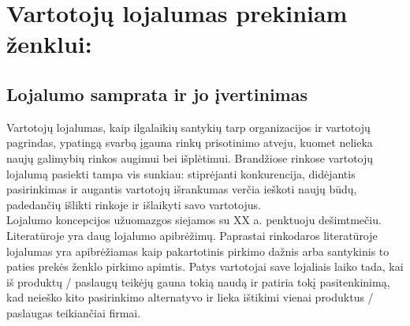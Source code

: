 \documentclass[12pt,titlepage]{article}
\begin{document}
\justify
\section{Vartotojų lojalumas prekiniam ženklui:}
\subsection{Lojalumo samprata ir jo įvertinimas}
\justify
\hspace{\parindent} 
Vartotojų lojalumas, kaip ilgalaikių santykių tarp organizacijos ir vartotojų pagrindas, ypatingą svarbą įgauna rinkų prisotinimo atveju, kuomet nelieka naujų galimybių rinkos augimui bei išplėtimui. Brandžiose rinkose vartotojų lojalumą pasiekti tampa vis sunkiau: stiprėjanti konkurencija, didėjantis pasirinkimas ir augantis vartotojų išrankumas verčia ieškoti naujų būdų, padedančių išlikti rinkoje ir išlaikyti savo vartotojus.\parencite{zikiene2010vartotojku}\\

Lojalumo koncepcijos užuomazgos siejamos su XX a. penktuoju dešimtmečiu. Literatūroje yra daug lojalumo apibrėžimų. Paprastai rinkodaros literatūroje lojalumas yra apibrėžiamas kaip pakartotinis pirkimo dažnis arba santykinis to paties prekės ženklo pirkimo apimtis.\parencite{oliver1999whence} Patys vartotojai save lojaliais laiko tada, kai iš produktų / paslaugų teikėjų gauna tokią naudą ir patiria tokį pasitenkinimą, kad neieško kito pasirinkimo alternatyvo ir lieka ištikimi vienai produktus / paslaugas teikiančiai firmai.\\

\justify
\end{document}
